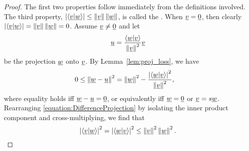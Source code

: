 \begin{proof}
The first two properties follow immediately from the definitions involved.
The third property, $\left| \left\langle \underline{v} | \underline{w} \right\rangle \right| \leq \left\| \underline{v} \right\| \left\| \underline{w} \right\|$, is called the .
When $\underline{v} = \underline{0}$, then clearly $\left| \left\langle \underline{v} | \underline{w} \right\rangle \right| = \left\| \underline{v} \right\| \left\| \underline{w} \right\| =0$.
Assume $\underline{v} \neq \underline{0}$ and let
\begin{equation*}
\underline{u} = \frac{ \left\langle \underline{w} | \underline{v} \right\rangle}{ \left\| \underline{v} \right\|^2 } \underline{v}
\end{equation*}
be the projection $\underline{w}$ onto $\underline{v}$.
By Lemma~\ref{lem:proj_loss},
we have
\begin{align} \label{equation:DifferenceProjection}
0 &\leq \left\| \underline{w} - \underline{u} \right\|^2
= \left\| \underline{w} \right\|^2
- \frac{ \left| \left\langle \underline{w} | \underline{v} \right\rangle \right|^2 }
{ \left\| \underline{v} \right\|^2 } ,
\end{align}
where equality holds iff $\underline{w}-\underline{u}=\underline{0}$, or equivalently iff $\underline{w}=\underline{0}$ or $\underline{v} = s \underline{w}$.
Rearranging \eqref{equation:DifferenceProjection} by isolating the inner product component and cross-multiplying, we find that
\begin{equation*}
\left| \left\langle \underline{v} | \underline{w} \right\rangle \right|^2 = \left| \left\langle \underline{w} | \underline{v} \right\rangle \right|^2 \leq \left\| \underline{v} \right\|^2 \left\| \underline{w} \right\|^2 .
\end{equation*}

\end{proof}
